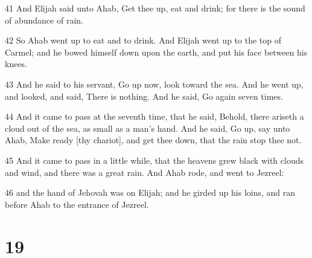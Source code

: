 \par 41 And Elijah said unto Ahab, Get thee up, eat and drink; for there is the sound of abundance of rain.
\par 42 So Ahab went up to eat and to drink. And Elijah went up to the top of Carmel; and he bowed himself down upon the earth, and put his face between his knees.
\par 43 And he said to his servant, Go up now, look toward the sea. And he went up, and looked, and said, There is nothing. And he said, Go again seven times.
\par 44 And it came to pass at the seventh time, that he said, Behold, there ariseth a cloud out of the sea, as small as a man's hand. And he said, Go up, say unto Ahab, Make ready [thy chariot], and get thee down, that the rain stop thee not.
\par 45 And it came to pass in a little while, that the heavens grew black with clouds and wind, and there was a great rain. And Ahab rode, and went to Jezreel:
\par 46 and the hand of Jehovah was on Elijah; and he girded up his loins, and ran before Ahab to the entrance of Jezreel.

\chapter{19}


